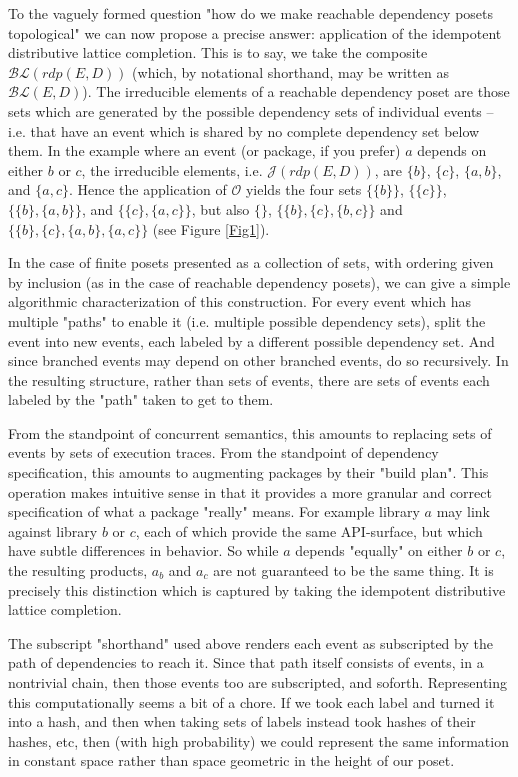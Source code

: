 \documentclass[hoptionsi,review,format=acmsmall]{acmart}
\theoremstyle{definition}
\newcommand{\Oc}{\mathcal{O}}
\newcommand{\Jc}{\mathcal{J}}
\newcommand{\BLc}{\mathcal{BL}}
\begin{document}
To the vaguely formed question "how do we make reachable dependency posets topological" we can now propose a precise answer: application of the idempotent distributive lattice completion. This is to say, we take the composite \(\BLc(rdp(E,D))\) (which, by notational shorthand, may be written as \(\BLc(E,D)\)). The irreducible elements of a reachable dependency poset are those sets which are generated by the possible dependency sets of individual events -- i.e. that have an event which is shared by no complete dependency set below them. In the example where an event (or package, if you prefer) \(a\) depends on either \(b\) or \(c\), the irreducible elements, i.e. \(\Jc(rdp(E,D))\), are \(\{b\}\), \(\{c\}\), \(\{a,b\}\), and \(\{a,c\}\). Hence the application of \(\Oc\) yields the four sets \(\{\{b\}\}\), \(\{\{c\}\}\), \(\{\{b\},\{a,b\}\}\), and \(\{\{c\},\{a,c\}\}\), but also \(\{\}\), \(\{\{b\},\{c\},\{b,c\}\}\) and \(\{\{b\},\{c\},\{a,b\},\{a,c\}\}\) (see Figure \ref{Fig1}).

In the case of finite posets presented as a collection of sets, with ordering given by inclusion (as in the case of reachable dependency posets), we can give a simple algorithmic characterization of this construction. For every event which has multiple "paths" to enable it (i.e. multiple possible dependency sets), split the event into new events, each labeled by a different possible dependency set. And since branched events may depend on other branched events, do so recursively. In the resulting structure, rather than sets of events, there are sets of events each labeled by the "path" taken to get to them. 

From the standpoint of concurrent semantics, this amounts to replacing sets of events by sets of execution traces. From the standpoint of dependency specification, this amounts to augmenting packages by their "build plan". This operation makes intuitive sense in that it provides a more granular and correct specification of what a package "really" means. For example library \(a\) may link against library \(b\) or \(c\), each of which provide the same API-surface, but which have subtle differences in behavior. So while \(a\) depends "equally" on either \(b\) or \(c\), the resulting products, \(a_b\) and \(a_c\) are not guaranteed to be the same thing. It is precisely this distinction which is captured by taking the idempotent distributive lattice completion.

The subscript "shorthand" used above renders each event as subscripted by the path of dependencies to reach it. Since that path itself consists of events, in a nontrivial chain, then those events too are subscripted, and soforth. Representing this computationally seems a bit of a chore. If we took each label and turned it into a hash, and then when taking sets of labels instead took hashes of their hashes, etc, then (with high probability) we could represent the same information in constant space rather than space geometric in the height of our poset.
\end{document}
